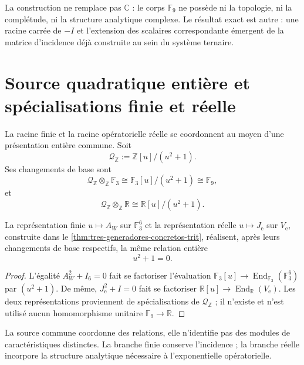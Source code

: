 La construction ne remplace pas \(\mathbb C\) : le corps \(\mathbb F_9\) ne
possède ni la topologie, ni la complétude, ni la structure analytique complexe. Le
résultat exact est autre : une racine carrée de \(-I\) et l'extension
des scalaires correspondante émergent de la matrice d'incidence déjà construite
au sein du système ternaire.

\section{Source quadratique entière et spécialisations finie et réelle}
\label{sec:fuente-cuadratica-integral-rev3}

La racine finie et la racine opératorielle réelle se coordonnent au moyen d'une
présentation entière commune. Soit
\begin{equation}
 \mathcal Q_{\mathbb Z}
 :=\mathbb Z[u]/(u^2+1).
 \label{eq:fuente-cuadratica-integral-rev3}
\end{equation}
Ses changements de base sont
\[
 \mathcal Q_{\mathbb Z}\otimes_{\mathbb Z}\mathbb F_3
 \cong\mathbb F_3[u]/(u^2+1)
 \cong\mathbb F_9,
\]
et
\[
 \mathcal Q_{\mathbb Z}\otimes_{\mathbb Z}\mathbb R
 \cong\mathbb R[u]/(u^2+1).
\]

\begin{theorem}
\label{thm:dos-realizaciones-fuente-cuadratica-rev3}
La représentation finie \(u\mapsto A_W\) sur
\(\mathbb F_3^6\) et la représentation réelle \(u\mapsto J_{\mathrm e}\) sur
\(V_{\mathrm e}\), construite dans le
\cref{thm:tres-generadores-concretos-trit}, réalisent, après leurs
changements de base respectifs, la même relation entière
\[
 u^2+1=0.
\]
\end{theorem}

\begin{proof}
L'égalité \(A_W^2+I_6=0\) fait se factoriser l'évaluation
\(\mathbb F_3[u]\to\operatorname{End}_{\mathbb F_3}(\mathbb F_3^6)\) par
\((u^2+1)\). De même, \(J_{\mathrm e}^2+I=0\) fait se factoriser
\(\mathbb R[u]\to\operatorname{End}_{\mathbb R}(V_{\mathrm e})\). Les deux
représentations proviennent de spécialisations de
\(\mathcal Q_{\mathbb Z}\) ; il n'existe et n'est utilisé aucun homomorphisme unitaire
\(\mathbb F_9\to\mathbb R\).
\end{proof}

La source commune coordonne des relations, elle n'identifie pas des modules de
caractéristiques distinctes. La branche finie conserve l'incidence ; la branche réelle
incorpore la structure analytique nécessaire à l'exponentielle opératorielle.

